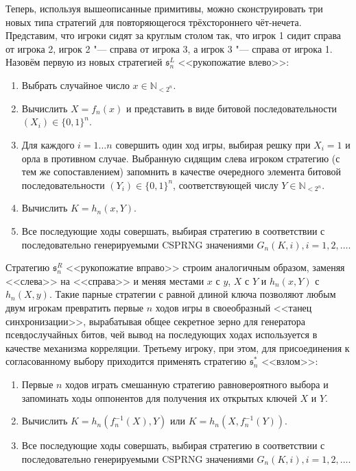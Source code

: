 Теперь, используя вышеописанные примитивы, можно сконструировать три новых типа стратегий для повторяющегося трёхстороннего чёт-нечета. Представим, что игроки сидят за круглым столом так, что игрок 1 сидит справа от игрока 2, игрок 2 "--- справа от игрока 3, а игрок 3 "--- справа от игрока 1. Назовём первую из новых стратегией $\mathfrak{s}^L_n$ <<рукопожатие влево>>:
\begin{enumerate}
	\item Выбрать случайное число $x \in \mathbb{N}_{<2^n}$.
	\item Вычислить $X = f_n(x)$ и представить в виде битовой последовательности $(X_i) \in \{0, 1\}^n$.
	\item Для каждого $i = 1 \ldots n$ совершить один ход игры, выбирая решку при $X_i = 1$ и орла в противном случае. Выбранную сидящим слева игроком стратегию (с тем же сопоставлением) запомнить в качестве очередного элемента битовой последовательности $(Y_i) \in \{0, 1\}^n$, соответствующей числу $Y \in \mathbb{N}_{<2^n}$.
	\item Вычислить $K = h_n(x, Y)$.
	\item Все последующие ходы совершать, выбирая стратегию в соответствии с последовательно генерируемыми CSPRNG значениями $G_n(K, i), i = 1, 2, \ldots$.
\end{enumerate}

Стратегию $\mathfrak{s}^R_n$ <<рукопожатие вправо>> строим аналогичным образом, заменяя <<слева>> на <<справа>> и меняя местами $x$ с $y$, $X$ с $Y$ и $h_n(x, Y)$ с $h_n(X, y)$. Такие парные стратегии с равной длиной ключа позволяют любым двум игрокам превратить первые $n$ ходов игры в своеобразный <<танец синхронизации>>, вырабатывая общее секретное зерно для генератора псевдослучайных битов, чей вывод на последующих ходах используется в качестве механизма корреляции. Третьему игроку, при этом, для присоединения к согласованному выбору приходится применять стратегию $\mathfrak{s}^*_n$ <<взлом>>:
\begin{enumerate}
	\item Первые $n$ ходов играть смешанную стратегию равновероятного выбора и запоминать ходы оппонентов для получения их открытых ключей $X$ и $Y$.
	\item Вычислить $K = h_n(f_n^{-1}(X), Y)$ или $K = h_n(X, f_n^{-1}(Y))$.
	\item Все последующие ходы совершать, выбирая стратегию в соответствии с последовательно генерируемыми CSPRNG значениями $G_n(K, i), i = 1, 2, \ldots$.
\end{enumerate}

